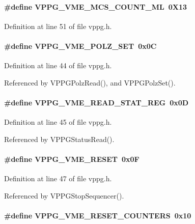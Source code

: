 \paragraph[{VPPG\_\-VME\_\-MCS\_\-COUNT\_\-ML}]{\setlength{\rightskip}{0pt plus 5cm}\#define VPPG\_\-VME\_\-MCS\_\-COUNT\_\-ML~0X13}\hfill\label{vppg_8h_ae3c258df5a6830626b7c49c445660875}


Definition at line 51 of file vppg.h.
\paragraph[{VPPG\_\-VME\_\-POLZ\_\-SET}]{\setlength{\rightskip}{0pt plus 5cm}\#define VPPG\_\-VME\_\-POLZ\_\-SET~0x0C}\hfill\label{vppg_8h_a2ac3aa524ccf21c653ac02b7584f71a1}


Definition at line 44 of file vppg.h.

Referenced by VPPGPolzRead(), and VPPGPolzSet().
\paragraph[{VPPG\_\-VME\_\-READ\_\-STAT\_\-REG}]{\setlength{\rightskip}{0pt plus 5cm}\#define VPPG\_\-VME\_\-READ\_\-STAT\_\-REG~0x0D}\hfill\label{vppg_8h_a0a68fd12d41c9b1d90364d1c48bdd899}


Definition at line 45 of file vppg.h.

Referenced by VPPGStatusRead().
\paragraph[{VPPG\_\-VME\_\-RESET}]{\setlength{\rightskip}{0pt plus 5cm}\#define VPPG\_\-VME\_\-RESET~0x0F}\hfill\label{vppg_8h_a8dd47e92745c0f4639fc7b03fe6216a2}


Definition at line 47 of file vppg.h.

Referenced by VPPGStopSequencer().
\paragraph[{VPPG\_\-VME\_\-RESET\_\-COUNTERS}]{\setlength{\rightskip}{0pt plus 5cm}\#define VPPG\_\-VME\_\-RESET\_\-COUNTERS~0x10}\hfill\label{vppg_8h_aedc828ad0c5c6d3cd7ab480978622e98}


